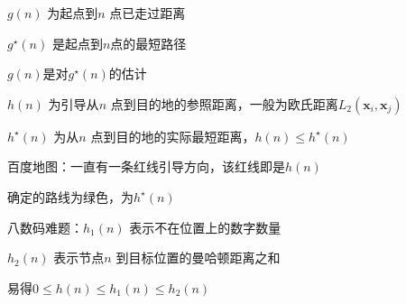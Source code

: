 $g\left( n \right) $ 为起点到$n$ 点已走过距离

$g^\star\left( n \right) $ 是起点到$n$点的最短路径

$g\left( n \right) $是对$g^\star\left( n \right) $的估计

$h\left( n \right) $ 为引导从$n$ 点到目的地的参照距离，一般为欧氏距离$L_2\left( \bm{x}_i,\bm{x}_j \right) $

$h^\star\left( n \right) $ 为从$n$ 点到目的地的实际最短距离，$h\left( n \right) \le h^\star\left( n \right) $
\begin{eg}
    百度地图：一直有一条红线引导方向，该红线即是$h\left( n \right) $ 

    确定的路线为绿色，为$h^\star\left( n \right) $
\end{eg}
\begin{eg}
    八数码难题：$h_1\left( n \right) $ 表示不在位置上的数字数量

     $h_2\left( n \right) $ 表示节点$n$ 到目标位置的曼哈顿距离之和

     易得$0\le h\left( n \right) \le h_1\left( n \right) \le h_2\left( n \right) $
\end{eg}

